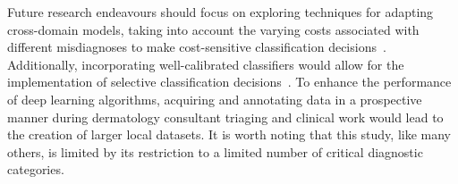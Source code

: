 Future research endeavours should focus on exploring techniques for adapting cross-domain models, taking into account the varying costs associated with different misdiagnoses to make cost-sensitive classification decisions~\citep{guan2021domain,carse2021robust}. Additionally, incorporating well-calibrated classifiers would allow for the implementation of selective classification decisions~\citep{carse2021robust,carse2022calibration}. To enhance the performance of deep learning algorithms, acquiring and annotating data in a prospective manner during dermatology consultant triaging and clinical work would lead to the creation of larger local datasets. It is worth noting that this study, like many others, is limited by its restriction to a limited number of critical diagnostic categories.